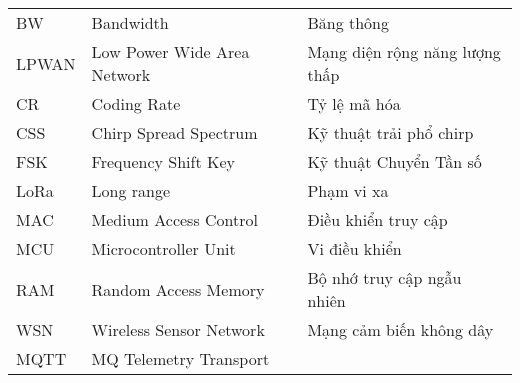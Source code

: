 \begin{tabular}{lll}
		BW         & Bandwidth                                                                                       & Băng thông                                                                              \\
		LPWAN      & Low Power Wide Area Network                                                                     & Mạng diện rộng năng lượng thấp                                                          \\
		CR         & Coding Rate                                                                                     & Tỷ lệ mã hóa                                                                            \\
		CSS        & Chirp Spread Spectrum                                                                           & Kỹ thuật trải phổ chirp                                                                 \\
		FSK        & Frequency Shift Key                                                                             & Kỹ thuật Chuyển Tần số                                                                  \\
		LoRa       & Long range                                                                                      & Phạm vi xa                                                                              \\
		MAC        & Medium Access Control                                                                           & Điều khiển truy cập                                                                     \\
		MCU        & Microcontroller Unit                                                                            & Vi điều khiển                                                                           \\
		RAM        & Random Access Memory                                                                            & Bộ nhớ truy cập ngẫu nhiên                                                              \\
		WSN        & Wireless Sensor Network                                                                         & Mạng cảm biến không dây                                                                 \\
		MQTT       & MQ Telemetry Transport                                                                          &                                                                                         \\

\end{tabular}
